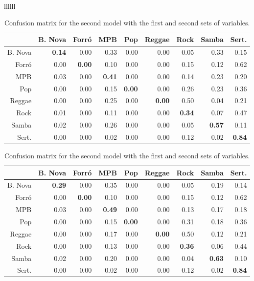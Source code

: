 \documentclass[twocolumn]{article}
\begin{document}
\begin{table}[ht]
\begin{tabular}{llllll}
\begin{table}[ht]
\caption{Confusion matrix for the model
with only the  first set of variables.}
\small
\vspace{3mm}
 \setlength\tabcolsep{1.5pt}
\centering
\begin{tabular}{rrrrrrrrr}
 & B. Nova & Forró & MPB & Pop & Reggae & Rock & Samba & Sert. \\ 
  \hline
B. Nova   & \textbf{0.14} & 0.00 & 0.33 & 0.00 & 0.00 & 0.05 & 0.33 & 0.15 \\ 
  Forró      & 0.00 & \textbf{0.00} & 0.10 & 0.00 & 0.00 & 0.15 & 0.12 & 0.62 \\ 
  MPB        & 0.03 & 0.00 & \textbf{0.41} & 0.00 & 0.00 & 0.14 & 0.23 & 0.20 \\ 
  Pop        & 0.00 & 0.00 & 0.15 & \textbf{0.00} & 0.00 & 0.26 & 0.23 & 0.36 \\ 
  Reggae     & 0.00 & 0.00 & 0.25 & 0.00 & \textbf{0.00} & 0.50 & 0.04 & 0.21 \\ 
  Rock       & 0.01 & 0.00 & 0.11 & 0.00 & 0.00 & \textbf{0.34} & 0.07 & 0.47 \\ 
  Samba      & 0.02 & 0.00 & 0.26 & 0.00 & 0.00 & 0.05 & \textbf{0.57} & 0.11 \\ 
  Sert.  & 0.00 & 0.00 & 0.02 & 0.00 & 0.00 & 0.12 & 0.02 & \textbf{0.84} \\ 
   \hline
\end{tabular}
\label{tab:conf_1}
\end{table}




\begin{table}[ht]
\caption{Confusion matrix for the second model
with the first and second sets of variables.}
\small
\vspace{3mm}
 \setlength\tabcolsep{1.5pt}
\centering
\begin{tabular}{rrrrrrrrr}
 & B. Nova & Forró & MPB & Pop & Reggae & Rock & Samba & Sert. \\ 
  \hline
B. Nova  & \textbf{0.29} & 0.00 & 0.35 & 0.00 & 0.00 & 0.05 & 0.19 & 0.14 \\ 
  Forró     & 0.00 & \textbf{0.00} & 0.10 & 0.00 & 0.00 & 0.15 & 0.12 & 0.62 \\ 
  MPB       & 0.03 & 0.00 & \textbf{0.49} & 0.00 & 0.00 & 0.13 & 0.17 & 0.18 \\ 
  Pop       & 0.00 & 0.00 & 0.15 & \textbf{0.00} & 0.00 & 0.31 & 0.18 & 0.36 \\ 
  Reggae    & 0.00 & 0.00 & 0.17 & 0.00 & \textbf{0.00} & 0.50 & 0.12 & 0.21 \\ 
  Rock      & 0.00 & 0.00 & 0.13 & 0.00 & 0.00 & \textbf{0.36} & 0.06 & 0.44 \\ 
  Samba     & 0.02 & 0.00 & 0.20 & 0.00 & 0.00 & 0.04 & \textbf{0.63} & 0.10 \\ 
  Sert. & 0.00 & 0.00 & 0.02 & 0.00 & 0.00 & 0.12 & 0.02 & \textbf{0.84} \\
     \hline
\end{tabular}
\label{tab:conf_2}
\end{table}




\end{tabular}
\end{table}
\end{document}
